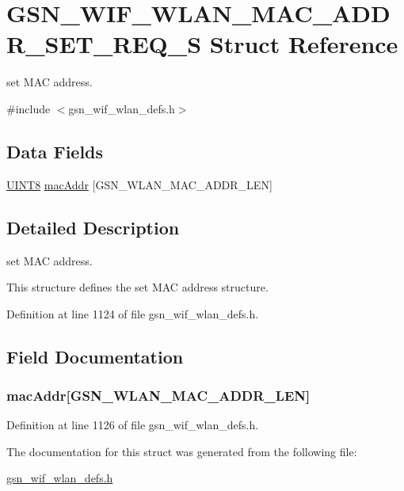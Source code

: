 \hypertarget{a00388}{
\section{GSN\_\-WIF\_\-WLAN\_\-MAC\_\-ADDR\_\-SET\_\-REQ\_\-S Struct Reference}
\label{a00388}
}


set MAC address.  




{\ttfamily \#include $<$gsn\_\-wif\_\-wlan\_\-defs.h$>$}

\subsection*{Data Fields}
\begin{DoxyCompactItemize}
\item 
\hyperlink{a00660_gab27e9918b538ce9d8ca692479b375b6a}{UINT8} \hyperlink{a00388_ae2a041fcbc5c6b029dc55fde7c0aeeb2}{macAddr} \mbox{[}GSN\_\-WLAN\_\-MAC\_\-ADDR\_\-LEN\mbox{]}
\end{DoxyCompactItemize}


\subsection{Detailed Description}
set MAC address. 

This structure defines the set MAC address structure. 

Definition at line 1124 of file gsn\_\-wif\_\-wlan\_\-defs.h.



\subsection{Field Documentation}
\hypertarget{a00388_ae2a041fcbc5c6b029dc55fde7c0aeeb2}{
\subsubsection[{macAddr}]{ {\bf macAddr}\mbox{[}GSN\_\-WLAN\_\-MAC\_\-ADDR\_\-LEN\mbox{]}}}
\label{a00388_ae2a041fcbc5c6b029dc55fde7c0aeeb2}


Definition at line 1126 of file gsn\_\-wif\_\-wlan\_\-defs.h.



The documentation for this struct was generated from the following file:\begin{DoxyCompactItemize}
\item 
\hyperlink{a00613}{gsn\_\-wif\_\-wlan\_\-defs.h}\end{DoxyCompactItemize}
